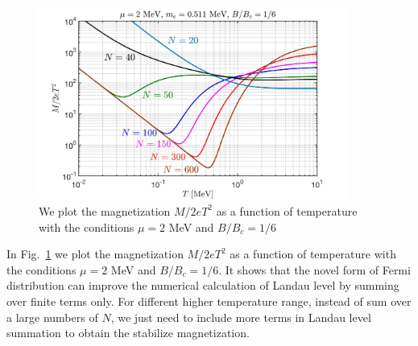 \documentclass[sn-mathphys,Numbered]{sn-jnl}
\begin{document}
\begin{figure}[ht]
\centering
\includegraphics[width=0.9\textwidth]{./plot/NewFermi_Magnetization_tot003}
\caption{We plot the magnetization $M/2eT^2$ as a function of temperature with the conditions $\mu=2$ MeV and $B/B_c=1/6$}
\label{M_Checking}
\end{figure}

In Fig.~\ref{M_Checking} we plot the magnetization $M/2eT^2$ as a function of temperature with the conditions $\mu=2$ MeV and $B/B_c=1/6$. It shows that the novel form of Fermi distribution can improve the numerical calculation of Landau level by summing over finite terms only. For different higher temperature range, instead of sum over a large numbers of $N$, we just need to include more terms in Landau level summation to obtain the stabilize magnetization.
\end{document}
